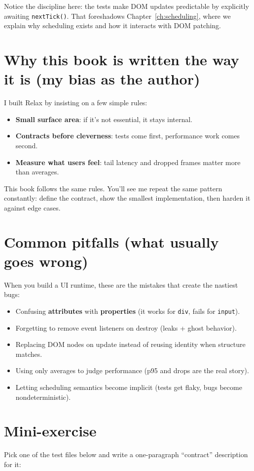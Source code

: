 Notice the discipline here: the tests make DOM updates predictable by explicitly awaiting \texttt{nextTick()}.
That foreshadows Chapter~\ref{ch:scheduling}, where we explain why scheduling exists and how it interacts with DOM patching.

\section{Why this book is written the way it is (my bias as the author)}
I built Relax by insisting on a few simple rules:

\begin{itemize}
  \item \textbf{Small surface area}: if it's not essential, it stays internal.
  \item \textbf{Contracts before cleverness}: tests come first, performance work comes second.
  \item \textbf{Measure what users feel}: tail latency and dropped frames matter more than averages.
\end{itemize}

This book follows the same rules.
You'll see me repeat the same pattern constantly: define the contract, show the smallest implementation, then harden it against edge cases.

\section{Common pitfalls (what usually goes wrong)}
When you build a UI runtime, these are the mistakes that create the nastiest bugs:

\begin{itemize}
  \item Confusing \textbf{attributes} with \textbf{properties} (it works for \texttt{div}, fails for \texttt{input}).
  \item Forgetting to remove event listeners on destroy (leaks + ghost behavior).
  \item Replacing DOM nodes on update instead of reusing identity when structure matches.
  \item Using only averages to judge performance (p95 and drops are the real story).
  \item Letting scheduling semantics become implicit (tests get flaky, bugs become nondeterministic).
\end{itemize}

\section{Mini-exercise}
Pick one of the test files below and write a one-paragraph ``contract'' description for it:

